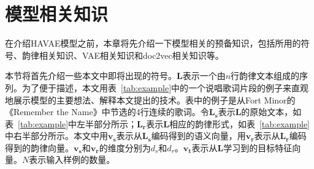 \chapter{模型相关知识} \label{chpt:prepare}
在介绍HAVAE模型之前，本章将先介绍一下模型相关的预备知识，包括所用的符号、韵律相关知识、VAE相关知识和doc2vec相关知识等。\par

本节将首先介绍一些本文中即将出现的符号。$\bm L$表示一个由$n$行韵律文本组成的序列。为了便于描述，本文用表~\ref{tab:example}中的一个说唱歌词片段的例子来直观地展示模型的主要想法、解释本文提出的技术。表中的例子是从Fort Minor的《Remember the Name》中节选的4行连续的歌词。令$\bm {L_s}$表示$\bm L$的原始文本，如表~\ref{tab:example}中左半部分所示；$\bm {{L}_r}$表示$\bm L$相应的韵律形式，如表~\ref{tab:example}中右半部分所示。本文中用$\bm {v_s}$表示从$\bm {L_s}$编码得到的语义向量，用$\bm {v_r}$表示从$\bm {L_r}$编码得到的韵律向量。$\bm {v_s}$和$\bm {v_r}$的维度分别为$d_s$和$d_r$。$\bm {v_t}$表示从$\bm L$学习到的目标特征向量。$N$表示输入样例的数量。\par




